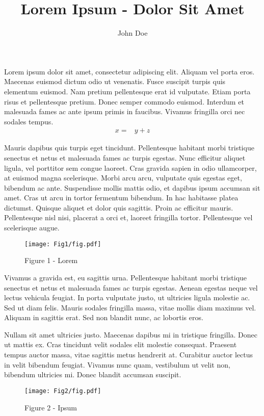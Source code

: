 \documentclass[11pt]{amsart}
\title{Lorem Ipsum - Dolor Sit Amet}
\author{John Doe}
\date{}
\begin{document}
\maketitle

Lorem ipsum dolor sit amet, consectetur adipiscing elit. Aliquam vel porta eros. Maecenas euismod dictum odio ut venenatis. Fusce suscipit turpis quis elementum euismod. Nam pretium pellentesque erat id vulputate. Etiam porta risus et pellentesque pretium. Donec semper commodo euismod. Interdum et malesuada fames ac ante ipsum primis in faucibus. Vivamus fringilla orci nec sodales tempus.
%
\begin{align}
x =& y + z
\end{align}

Mauris dapibus quis turpis eget tincidunt. Pellentesque habitant morbi tristique senectus et netus et malesuada fames ac turpis egestas. Nunc efficitur aliquet ligula, vel porttitor sem congue laoreet. Cras gravida sapien in odio ullamcorper, at euismod magna scelerisque. Morbi arcu arcu, vulputate quis egestas eget, bibendum ac ante. Suspendisse mollis mattis odio, et dapibus ipsum accumsan sit amet. Cras ut arcu in tortor fermentum bibendum. In hac habitasse platea dictumst. Quisque aliquet et dolor quis sagittis. Proin ac efficitur mauris. Pellentesque nisl nisi, placerat a orci et, laoreet fringilla tortor. Pellentesque vel scelerisque augue.

\begin{figure}[htbp]
   \centering
   \texttt{[image: Fig1/fig.pdf]}
   \caption{Figure 1 - Lorem}
   \label{fig:fig1}
\end{figure}

Vivamus a gravida est, eu sagittis urna. Pellentesque habitant morbi tristique senectus et netus et malesuada fames ac turpis egestas. Aenean egestas neque vel lectus vehicula feugiat. In porta vulputate justo, ut ultricies ligula molestie ac. Sed ut diam felis. Mauris sodales fringilla massa, vitae mollis diam maximus vel. Aliquam in sagittis erat. Sed non blandit nunc, ac lobortis eros.

Nullam sit amet ultricies justo. Maecenas dapibus mi in tristique fringilla. Donec ut mattis ex. Cras tincidunt velit sodales elit molestie consequat. Praesent tempus auctor massa, vitae sagittis metus hendrerit at. Curabitur auctor lectus in velit bibendum feugiat. Vivamus nunc quam, vestibulum ut velit non, bibendum ultricies mi. Donec blandit accumsan suscipit.

\begin{figure}[htbp]
   \centering
   \texttt{[image: Fig2/fig.pdf]}
   \caption{Figure 2 - Ipsum}
   \label{fig:fig2}
\end{figure}
\end{document}
